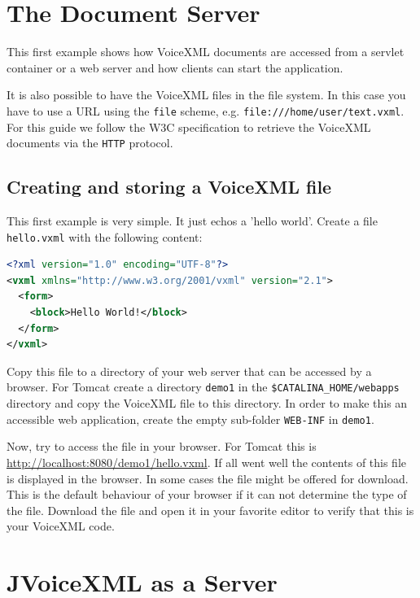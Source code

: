 \documentclass[11pt,a4paper]{book}
\begin{document}
\chapter{The Document Server}
\label{cha:document-server}

This first example shows how VoiceXML documents are accessed from a
servlet container or a web server and how clients can start the application.

It is also possible to have the VoiceXML files in the file system. In this case
you have to use a URL using the \lstinline{file} scheme, e.g.
\lstinline{file:///home/user/text.vxml}. For this guide we follow the W3C
specification to retrieve the VoiceXML documents via the \lstinline{HTTP}
protocol.

\section{Creating and storing a VoiceXML file}
\label{sec:hello-vxml}

This first example is very simple. It just echos a 'hello world'.
Create a file \texttt{hello.vxml} with the following content:

\begin{lstlisting}[language=XML]
<?xml version="1.0" encoding="UTF-8"?> 
<vxml xmlns="http://www.w3.org/2001/vxml" version="2.1">
  <form>
    <block>Hello World!</block>
  </form>
</vxml>
\end{lstlisting}

Copy this file to a directory of your web server that can be accessed
by a browser. For Tomcat create a directory \texttt{demo1} in
the \texttt{\$CATALINA\_HOME/webapps} directory and copy the VoiceXML
file to this directory. In order to make this
an accessible web application, create the empty sub-folder \texttt{WEB-INF}
in \texttt{demo1}.

Now, try to access the file in your browser. For Tomcat this is
\url{http://localhost:8080/demo1/hello.vxml}. If all went well the
contents of this file is displayed in the browser. In some cases the file
might be offered for download. This is the default behaviour of your browser if
it can not determine the type of the file. Download the file and open it in your
favorite editor to verify that this is your VoiceXML code.


\chapter{JVoiceXML as a Server}
\label{cha:callmanager}
\end{document}
